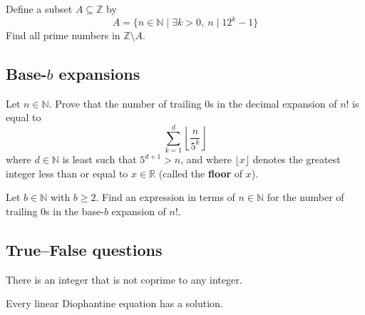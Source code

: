\begin{chapex}
Define a subset $A \subseteq \mathbb{Z}$ by
\[ A = \{ n \in \mathbb{N} \mid \exists k > 0,~ n \mid 12^k-1 \} \]
Find all prime numbers in $\mathbb{Z} \setminus A$.
\end{chapex}

\subsection*{Base-$b$ expansions}

\begin{chapex}
Let $n \in \mathbb{N}$. Prove that the number of trailing $0$s in the decimal expansion of $n!$ is equal to
\[ \sum_{k=1}^d \left\lfloor \dfrac{n}{5^k} \right \rfloor \]
where $d \in \mathbb{N}$ is least such that $5^{d+1}>n$, and where $\lfloor x \rfloor$  denotes the greatest integer less than or equal to $x \in \mathbb{R}$ (called the \textbf{floor} of $x$).
\end{chapex}

\begin{chapex}
Let $b \in \mathbb{N}$ with $b \ge 2$. Find an expression in terms of $n \in \mathbb{N}$ for the number of trailing $0$s in the base-$b$ expansion of $n!$.
\end{chapex}

\subsection*{True--False questions}


\begin{chapex} %
\label{cqNumberTheoryTFBegin}
There is an integer that is not coprime to any integer.
\end{chapex}

\begin{chapex} %
Every linear Diophantine equation has a solution.
\end{chapex}

